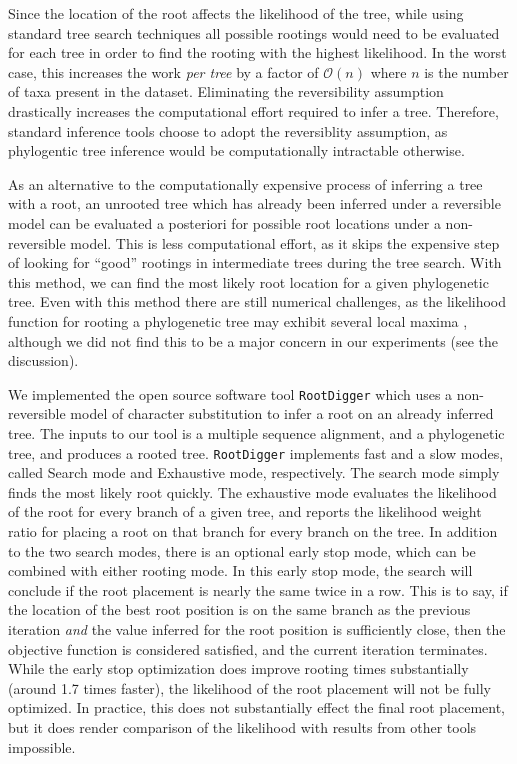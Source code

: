 \documentclass{article}
\newcommand{\RootDiggertt}{\texttt{RootDigger}}
\begin{document}
Since the location of the root affects the likelihood of the tree, while using
standard tree search techniques all possible rootings would need to be evaluated
for each tree in order to find the rooting with the highest likelihood.  In the
worst case, this increases the work {\em per tree} by a factor of
$\mathcal{O}(n)$ where $n$ is the number of taxa present in the dataset.
Eliminating the reversibility assumption drastically increases the computational
effort required to infer a tree. Therefore, standard inference tools choose to
adopt the reversiblity assumption, as phylogentic tree inference would be
computationally intractable otherwise.

As an alternative to the computationally expensive process of inferring a tree
with a root, an unrooted tree which has already been inferred under a reversible
model can be evaluated a posteriori for possible root locations under a
non-reversible model.  This is less computational effort, as it skips the
expensive step of looking for ``good'' rootings in intermediate trees during the
tree search.  With this method, we can find the most likely root location for a
given phylogenetic tree.  Even with this method there are still numerical
challenges, as the likelihood function for rooting a phylogenetic tree may
exhibit several local maxima \cite{huelsenbeck_inferring_2002}, although we did
not find this to be a major concern in our experiments (see the discussion).

We implemented the open source software tool \RootDiggertt{} which uses a
non-reversible model of character substitution to infer a root on an already
inferred tree. The inputs to our tool is a multiple sequence alignment, and a
phylogenetic tree, and produces a rooted tree. \RootDiggertt{} implements fast
and a slow modes, called Search mode and Exhaustive mode, respectively. The
search mode simply finds the most likely root quickly. The exhaustive mode
evaluates the likelihood of the root for every branch of a given tree, and
reports the likelihood weight ratio \cite{strimmer_inferring_2002} for placing a
root on that branch for every branch on the tree. In addition to the two search
modes, there is an optional early stop mode, which can be combined with either
rooting mode. In this early stop mode, the search will conclude if the root
placement is nearly the same twice in a row. This is to say, if the location of
the best root position is on the same branch as the previous iteration {\em and}
the value inferred for the root position is sufficiently close, then the
objective function is considered satisfied, and the current iteration
terminates.  While the early stop optimization does improve rooting times
substantially (around 1.7 times faster), the likelihood of the root placement
will not be fully optimized.  In practice, this does not substantially effect
the final root placement, but it does render comparison of the likelihood with
results from other tools impossible.
\end{document}
